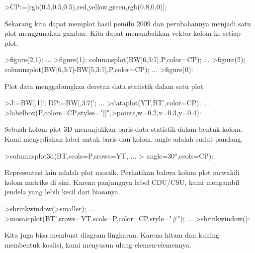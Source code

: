 \documentclass{article}
\begin{document}
\begin{eulernotebook}
\begin{eulercomment}
\begin{eulercomment}
\begin{eulercomment}
\end{eulercomment}
\begin{eulerprompt}
>CP:=[rgb(0.5,0.5,0.5),red,yellow,green,rgb(0.8,0,0)];
\end{eulerprompt}
\begin{eulercomment}
Sekarang kita dapat memplot hasil pemilu 2009 dan perubahannya menjadi
satu plot menggunakan gambar. Kita dapat menambahkan vektor kolom ke
setiap plot.
\end{eulercomment}
\begin{eulerprompt}
>figure(2,1);  ...
>figure(1); columnsplot(BW[6,3:7],P,color=CP); ...
>figure(2); columnsplot(BW[6,3:7]-BW[5,3:7],P,color=CP);  ...
>figure(0):
\end{eulerprompt}
\begin{eulercomment}
Plot data menggabungkan deretan data statistik dalam satu plot.
\end{eulercomment}
\begin{eulerprompt}
>J:=BW[,1]'; DP:=BW[,3:7]'; ...
>dataplot(YT,BT',color=CP);  ...
>labelbox(P,colors=CP,styles="[]",>points,w=0.2,x=0.3,y=0.4):
\end{eulerprompt}
\begin{eulercomment}
Sebuah kolom plot 3D menunjukkan baris data statistik dalam bentuk
kolom. Kami menyediakan label untuk baris dan kolom. angle adalah
sudut pandang.
\end{eulercomment}
\begin{eulerprompt}
>columnsplot3d(BT,scols=P,srows=YT, ...
>  angle=30°,ccols=CP):
\end{eulerprompt}
\begin{eulercomment}
Representasi lain adalah plot mosaik. Perhatikan bahwa kolom plot
mewakili kolom matriks di sini. Karena panjangnya label CDU/CSU, kami
mengambil jendela yang lebih kecil dari biasanya.
\end{eulercomment}
\begin{eulerprompt}
>shrinkwindow(>smaller);  ...
>mosaicplot(BT',srows=YT,scols=P,color=CP,style="#"); ...
>shrinkwindow():
\end{eulerprompt}
\begin{eulercomment}
Kita juga bisa membuat diagram lingkaran. Karena hitam dan kuning
membentuk koalisi, kami menyusun ulang elemen-elemennya.
\end{eulercomment}

\end{eulercomment}
\end{eulercomment}
\end{eulernotebook}
\end{document}
